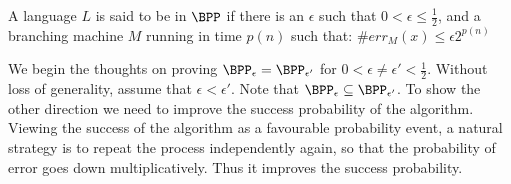 \begin{definition}[BPP]
A language $L$ is said to be in $\BPP$ if there is an $\epsilon$ such
that $0 < \epsilon \le \frac{1}{2}$, and a branching machine $M$
running in time $p(n)$ such that: $\#err_M(x) \le \epsilon2^{p(n)}$
\end{definition}

We begin the thoughts on proving $\BPP_\epsilon = \BPP_{\epsilon'}$
for $0 < \epsilon \ne \epsilon' < \frac{1}{2}$. Without loss of
generality, assume that $\epsilon < \epsilon'$.  Note that
$\BPP_\epsilon \subseteq \BPP_{\epsilon'}$. To show the other
direction we need to improve the success probability of the
algorithm. Viewing the success of the algorithm as a favourable
probability event, a natural strategy is to repeat the process
independently again, so that the probability of error goes down
multiplicatively. Thus it improves the success probability.

